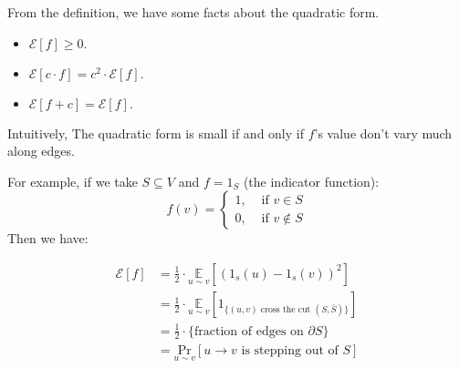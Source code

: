\documentclass{article}
\begin{document}
From the definition, we have some facts about the quadratic form.
\begin{itemize}
  \item $\mathcal{E}[f] \geq 0.$
  \item $\mathcal{E}[c \cdot f] = c^2 \cdot \mathcal{E}[f].$
  \item $\mathcal{E}[f + c] = \mathcal{E}[f].$
\end{itemize}
Intuitively, The quadratic form is small if and only if $f$'s value don't vary much along edges.
\par For example, if we take $S \subseteq V$ and $f = 1_{S}$ (the indicator function):
$$
f(v)=\left\{
  \begin{array}{ll}
  1, & \text { if } v \in S \\
  0, & \text { if } v \notin S
  \end{array}
  \right.
$$
Then we have:

\begin{align*}
  \mathcal{E}[f] &= \frac{1}{2} \cdot \underset{u \sim v}{\mathbb{E}}[(1_{s}(u) - 1_{s}(v))^2] \\
  &= \frac{1}{2} \cdot \underset{u \sim v}{\mathbb{E}}[1_{\{(u,v) \text{ cross the cut } (S, \bar{S})\}}] \\
  &= \frac{1}{2} \cdot \{\text{fraction of edges on } \partial S\} \\
  &= \underset{u \sim v}{\text{Pr}} [ u \rightarrow v \text{ is stepping out of } S]
\end{align*}
\end{document}
